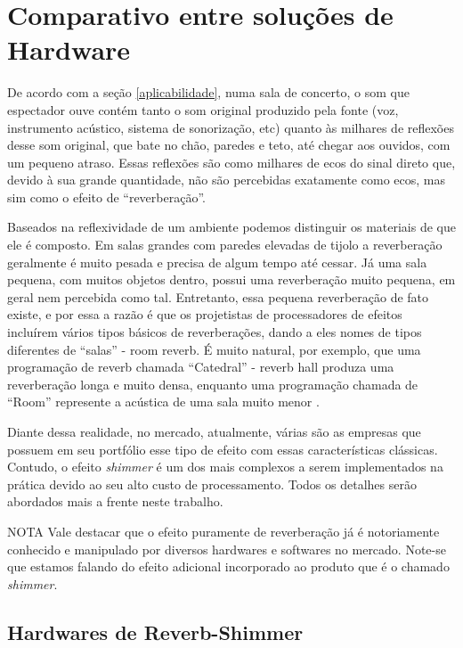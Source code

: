 						
\section{Comparativo entre soluções de Hardware}
		
		De acordo com a seção \ref{aplicabilidade}, numa sala de concerto, o som que espectador ouve contém tanto o som original produzido pela fonte (voz, instrumento acústico, sistema de sonorização, etc) quanto às milhares de reflexões desse som original, que bate no chão, paredes e teto, até chegar aos ouvidos, com um pequeno atraso. Essas reflexões são como milhares de ecos do sinal direto que, devido à sua grande quantidade, não são percebidas exatamente como ecos, mas sim como o efeito de “reverberação”. 
		
		Baseados na reflexividade de um ambiente podemos distinguir os materiais de que ele é composto. Em salas grandes com paredes elevadas de tijolo a reverberação geralmente é muito pesada e precisa de algum tempo até cessar. Já uma sala pequena, com muitos objetos dentro, possui uma reverberação muito pequena, em geral nem percebida como tal. Entretanto, essa pequena reverberação de fato existe, e por essa a razão é que os projetistas de processadores de efeitos incluírem vários tipos básicos de reverberações, dando a eles nomes de tipos diferentes de “salas” - room reverb. É muito natural, por exemplo, que uma programação de reverb chamada “Catedral” - reverb hall produza uma reverberação longa e muito densa, enquanto uma programação chamada de “Room” represente a acústica de uma sala muito menor \cite{Albar2007}. 
		
		Diante dessa realidade, no mercado, atualmente, várias são as empresas que possuem em seu portfólio esse tipo de efeito com essas características clássicas. Contudo, o efeito \textit{shimmer} é um dos mais complexos a serem implementados na prática devido ao seu alto custo de processamento. Todos os detalhes serão abordados mais a frente neste trabalho.
		
		\begin{mymdframed}{NOTA}
			Vale destacar que o efeito puramente de reverberação já é notoriamente conhecido e manipulado por diversos hardwares e softwares no mercado. Note-se que estamos falando do efeito adicional incorporado ao produto que é o chamado \textit{shimmer}.
		\end{mymdframed}
	
		\subsection{Hardwares de Reverb-Shimmer}
			
